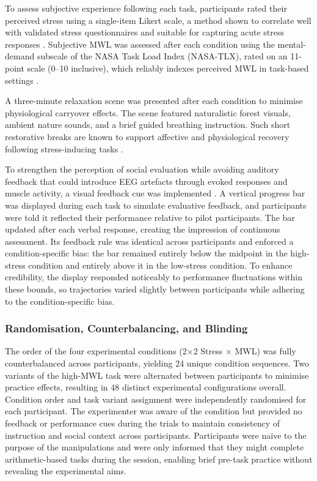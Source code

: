 \documentclass[lettersize,journal]{IEEEtran}
\begin{document}
To assess subjective experience following each task, participants rated their perceived stress using a single-item Likert scale, a method shown to correlate well with validated stress questionnaires and suitable for capturing acute stress responses \cite{littmanReliabilityValidity22006}. Subjective MWL was assessed after each condition using the mental-demand subscale of the NASA Task Load Index (NASA-TLX), rated on an 11-point scale (0–10 inclusive), which reliably indexes perceived MWL in task-based settings \cite{hartDevelopmentNASATLXTask1988}.

A three-minute relaxation scene was presented after each condition to minimise physiological carryover effects. The scene featured naturalistic forest visuals, ambient nature sounds, and a brief guided breathing instruction. Such short restorative breaks are known to support affective and physiological recovery following stress-inducing tasks \cite{chanNatureVirtualReality2021, albulescuGiveMeBreak2022, kumpulainenAssessingWellbeingBenefits2024}.

To strengthen the perception of social evaluation while avoiding auditory feedback that could introduce EEG artefacts through evoked responses and muscle activity, a visual feedback cue was implemented \cite{ahissarSpeechComprehensionCorrelated2001}. A vertical progress bar was displayed during each task to simulate evaluative feedback, and participants were told it reflected their performance relative to pilot participants. The bar updated after each verbal response, creating the impression of continuous assessment. Its feedback rule was identical across participants and enforced a condition-specific bias: the bar remained entirely below the midpoint in the high-stress condition and entirely above it in the low-stress condition. To enhance credibility, the display responded noticeably to performance fluctuations within these bounds, so trajectories varied slightly between participants while adhering to the condition-specific bias. 

\subsubsection{Randomisation, Counterbalancing, and Blinding}
The order of the four experimental conditions (2×2 Stress × MWL) was fully counterbalanced across participants, yielding 24 unique condition sequences. Two variants of the high-MWL task were alternated between participants to minimise practice effects, resulting in 48 distinct experimental configurations overall. Condition order and task variant assignment were independently randomised for each participant. The experimenter was aware of the condition but provided no feedback or performance cues during the trials to maintain consistency of instruction and social context across participants. Participants were naïve to the purpose of the manipulations and were only informed that they might complete arithmetic-based tasks during the session, enabling brief pre-task practice without revealing the experimental aims.
\end{document}
